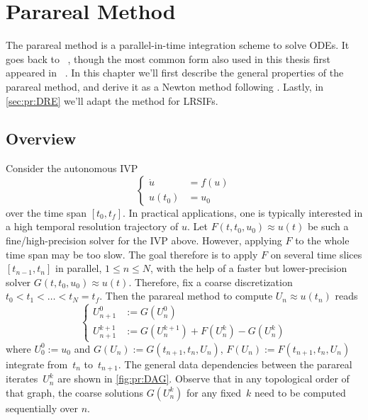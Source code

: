 \chapter{Parareal Method}
\label{sec:pr}

The parareal method is a parallel-in-time integration scheme to solve \acp{ODE}.
It goes back to \citeauthor{Lions2001}~\cite{Lions2001},
though the most common form also used in this thesis first appeared in \citeauthor{Baffico2002}~\cite{Baffico2002}.
In this chapter we'll first describe the general properties of the parareal method,
and derive it as a Newton method following \cite{Gander2007}.
Lastly, in \autoref{sec:pr:DRE} we'll adapt the method for \acp{LRSIF}.

\section{Overview}
\label{sec:pr:properties}

Consider the autonomous \ac{IVP}
\begin{equation}
  \label{eq:IVP}
  \left\{
  \begin{aligned}
    \dot u &= f(u) \\
    u(t_0) &= u_0
  \end{aligned}
  \right.
\end{equation}
over the time span $[t_0, t_f]$.
In practical applications,
one is typically interested in a high temporal resolution trajectory of $u$.
Let $F(t, t_0, u_0) \approx u(t)$ be such a fine/high-precision solver for the \ac{IVP} above.
However, applying $F$ to the whole time span may be too slow.
The goal therefore is to apply $F$ on several time slices $[t_{n-1}, t_n]$ in parallel,
$1 \leq n \leq N$,
with the help of a faster but lower-precision solver $G(t, t_0, u_0) \approx u(t)$.
Therefore, fix a coarse discretization $t_0 < t_1 < \ldots < t_N = t_f$.
Then the parareal method to compute $U_n \approx u(t_n)$ reads
\begin{equation}
  \label{eq:pr:method}
  \left\{
  \begin{aligned}
    U^0_{n+1} &:= G(U^0_n) \\
    U^{k+1}_{n+1} &:= G(U^{k+1}_n) + F(U^k_n) - G(U^k_n)
  \end{aligned}
  \right.
\end{equation}
where $U^0_0 := u_0$ and $G(U_n) := G(t_{n+1}, t_n, U_n)$,
$F(U_n) := F(t_{n+1}, t_n, U_n)$
integrate from~$t_n$ to~$t_{n+1}$.
The general data dependencies between the parareal iterates~$U_n^k$
are shown in \autoref{fig:pr:DAG}.
Observe that in any topological order of that graph,
the coarse solutions $G(U_n^k)$ for any fixed~$k$ need to be computed sequentially over $n$.

